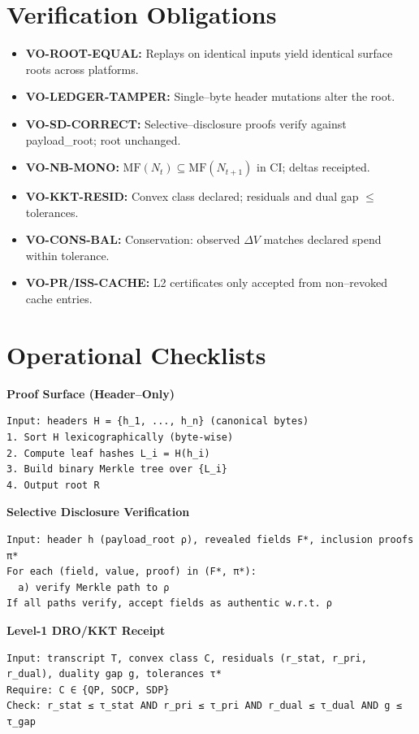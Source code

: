 \documentclass[11pt]{article}
\theoremstyle{plain}
\theoremstyle{definition}
\theoremstyle{remark}
\def\texttt#1{#1}%
\newcommand{\code}[1]{\texttt{#1}}
\begin{document}
\section{Verification Obligations}
\begin{itemize}
  \item \textbf{VO-ROOT-EQUAL:} Replays on identical inputs yield identical surface roots across platforms.
  \item \textbf{VO-LEDGER-TAMPER:} Single--byte header mutations alter the root.
  \item \textbf{VO-SD-CORRECT:} Selective--disclosure proofs verify against \code{payload\_root}; root unchanged.
  \item \textbf{VO-NB-MONO:} $\mathrm{MF}(N_t)\subseteq \mathrm{MF}(N_{t+1})$ in CI; deltas receipted.
  \item \textbf{VO-KKT-RESID:} Convex class declared; residuals and dual gap $\le$ tolerances.
  \item \textbf{VO-CONS-BAL:} Conservation: observed $\Delta V$ matches declared spend within tolerance.
  \item \textbf{VO-PR/ISS-CACHE:} L2 certificates only accepted from non--revoked cache entries.
\end{itemize}

\section{Operational Checklists}
\begin{auditbox}
\textbf{Proof Surface (Header--Only)}
\begin{verbatim}
Input: headers H = {h_1, ..., h_n} (canonical bytes)
1. Sort H lexicographically (byte-wise)
2. Compute leaf hashes L_i = H(h_i)
3. Build binary Merkle tree over {L_i}
4. Output root R
\end{verbatim}
\end{auditbox}

\begin{auditbox}
\textbf{Selective Disclosure Verification}
\begin{verbatim}
Input: header h (payload_root ρ), revealed fields F*, inclusion proofs π*
For each (field, value, proof) in (F*, π*):
  a) verify Merkle path to ρ
If all paths verify, accept fields as authentic w.r.t. ρ
\end{verbatim}
\end{auditbox}

\begin{auditbox}
\textbf{Level-1 DRO/KKT Receipt}
\begin{verbatim}
Input: transcript T, convex class C, residuals (r_stat, r_pri, r_dual), duality gap g, tolerances τ*
Require: C ∈ {QP, SOCP, SDP}
Check: r_stat ≤ τ_stat AND r_pri ≤ τ_pri AND r_dual ≤ τ_dual AND g ≤ τ_gap
\end{verbatim}
\end{auditbox}
\end{document}
